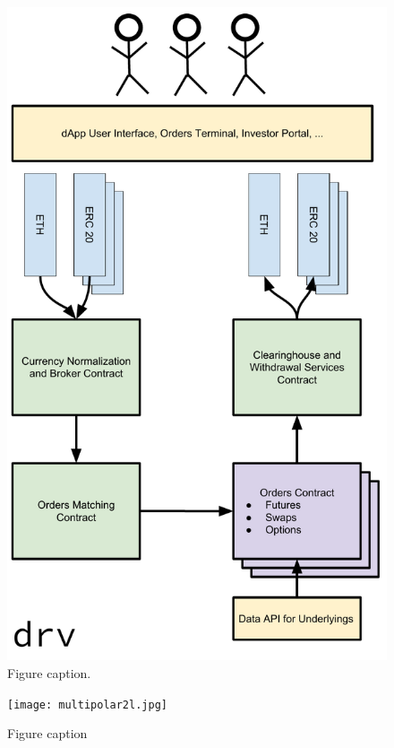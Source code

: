 \documentclass{winnower}
\begin{document}
\begin{figure}
\begin{center}
\includegraphics[scale=0.55]{Overview.pdf}\vspace{-1.29cm}
\caption
{Figure caption. }
\label{fig:f1}
\end{center}
\end{figure}

\begin{figure}
\begin{center}
\texttt{[image: multipolar2l.jpg]}
\caption
{Figure caption}
\label{fig:f2}
\end{center}
\end{figure}
\fi
\end{document}
